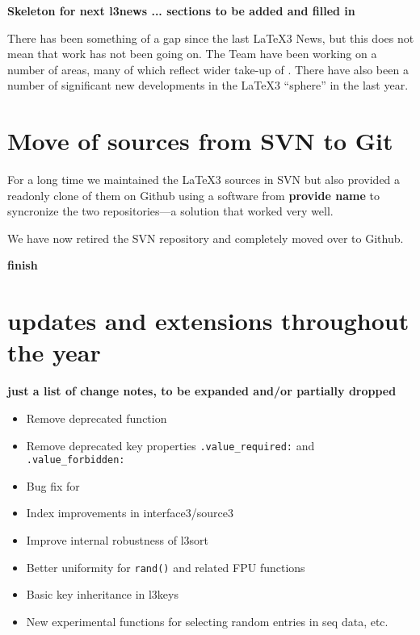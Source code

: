 \documentclass{ltnews}
\begin{document}
\maketitle

\textbf{Skeleton for next l3news ... sections to be added and filled in}

There has been something of a gap since the last \LaTeX3 News, but this does
not mean that work has not been going on. The Team have been working on a
number of areas, many of which reflect wider take-up of . There have
also been a number of significant new developments in the \LaTeX3
\enquote{sphere} in the last year.

\section{Move of sources from SVN to Git}

For a long time we maintained the \LaTeX3 sources in SVN but also provided a
readonly clone of them on Github using a software from \textbf{provide
  name} to syncronize the two repositories---a solution that worked very well.

We have now retired the SVN repository and completely moved over to
Github.

\textbf{finish}





\section{ updates and extensions throughout the year}

\textbf{just a list of change notes, to be expanded and/or partially dropped}



\begin{itemize}
\item Remove deprecated function 
\item Remove deprecated key properties \texttt{.value_required:}
  and \texttt{.value_forbidden:}
\item Bug fix for 
\item Index improvements in interface3/source3
\item Improve internal robustness of l3sort
\item Better uniformity for \texttt{rand()} and related
  FPU functions
\item Basic key inheritance in l3keys
\item New experimental functions for selecting random
  entries in seq data, etc.
\end{itemize}  
\end{document}
